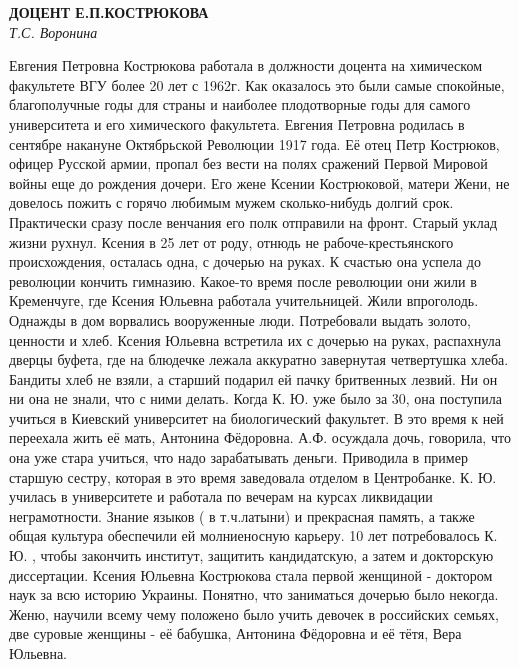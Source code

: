 \begin{center}{ \bf  ДОЦЕНТ Е.П.КОСТРЮКОВА}\\
{\it Т.С. Воронина} \\
\end{center}

Евгения Петровна Кострюкова работала в должности доцента на химическом факультете ВГУ более 20 лет с 1962г. Как оказалось это были самые спокойные, благополучные годы для страны и наиболее плодотворные годы для самого университета и его химического факультета.
Евгения Петровна родилась в сентябре накануне Октябрьской Революции 1917 года. Её отец Петр Кострюков, офицер Русской армии, пропал без вести на полях сражений Первой Мировой войны еще до рождения дочери. Его жене Ксении Кострюковой, матери Жени, не довелось пожить с горячо любимым мужем сколько-нибудь долгий срок. Практически сразу после венчания его полк отправили на фронт.
Старый уклад жизни рухнул. Ксения в 25 лет от роду, отнюдь не рабоче-крестьянского происхождения, осталась одна, с дочерью на руках. К счастью она успела до революции кончить гимназию. Какое-то время после революции они жили в Кременчуге, где Ксения Юльевна работала учительницей. Жили впроголодь. Однажды в дом ворвались вооруженные люди. Потребовали выдать золото, ценности и хлеб. Ксения Юльевна встретила их с дочерью на руках, распахнула дверцы буфета, где на блюдечке лежала аккуратно завернутая четвертушка хлеба. Бандиты хлеб не взяли, а старший подарил ей пачку бритвенных лезвий. Ни он ни она не знали, что с ними делать.
Когда К. Ю. уже было за 30, она поступила учиться в Киевский университет на биологический факультет. В это время к ней переехала жить её мать, Антонина Фёдоровна. А.Ф. осуждала дочь, говорила, что она уже стара учиться, что надо зарабатывать деньги. Приводила в пример старшую сестру, которая в это время заведовала отделом в Центробанке. К. Ю. училась в университете и работала по вечерам на курсах ликвидации неграмотности. Знание языков ( в т.ч.латыни) и прекрасная память, а также общая культура обеспечили ей молниеносную карьеру. 10 лет потребовалось К. Ю. , чтобы закончить институт, защитить кандидатскую, а затем и докторскую диссертации. Ксения Юльевна Кострюкова стала первой женщиной - доктором наук за всю историю Украины.
Понятно, что заниматься дочерью было некогда. Женю, научили всему чему положено было учить девочек в российских семьях, две суровые женщины - её бабушка, Антонина Фёдоровна и её тётя, Вера Юльевна.
